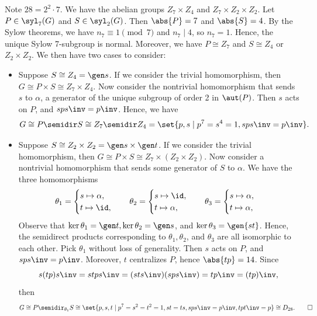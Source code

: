 \begin{sol}
    Note $28 = 2^2 \cdot 7$.
	We have the abelian groups $Z_7 \times Z_4$ and $Z_7 \times Z_2 \times Z_2$.
	Let $P \in \syl_7(G)$ and $S \in \syl_2(G)$.
	Then $\abs{P} = 7$ and $\abs{S} = 4$.
	By the Sylow theorems, we have $n_7 \equiv 1 \pmod 7$ and $n_7 \mid 4$, so $n_7 = 1$.
	Hence, the unique Sylow 7-subgroup is normal.
	Moreover, we have $P \cong Z_7$ and $S \cong Z_4$ or $Z_2 \times Z_2$.
	We then have two cases to consider:
    \begin{itemize}
        \item Suppose $S \cong Z_4 = \gen s$.
        If we consider the trivial homomorphism, then $G \cong P \times S \cong Z_7 \times Z_4$.
        Now consider the nontrivial homomorphism that sends $s$ to $\alpha$, a generator of the unique subgroup of order 2 in $\aut(P)$.
        Then $s$ acts on $P$, and $sps\inv = p\inv$.
        Hence, we have
        \[
        	G \cong P \semidir S \cong Z_7 \semidir Z_4 = \set{p, s \mid p^7 = s^4 = 1, sps\inv = p\inv}.
        \]
        \item Suppose $S \cong Z_2 \times Z_2 = \gen s \times \gen t$.
        If we consider the trivial homomorphism, then $G \cong P \times S \cong Z_7 \times (Z_2 \times Z_2)$.
        Now consider a nontrivial homomorphism that sends some generator of $S$ to $\alpha$.
        We have the three homomorphisms
        \[
        	\theta_1 = 
            \begin{cases}
                s \mapsto \alpha, \\
                t \mapsto \id,
            \end{cases} \quad
            \theta_2 = 
            \begin{cases}
                s \mapsto \id, \\
                t \mapsto \alpha,
            \end{cases} \quad
            \theta_3 = 
            \begin{cases}
                s \mapsto \alpha, \\
                t \mapsto \alpha,
            \end{cases}
        \]
        Observe that $\ker\theta_1 = \gen t, \ker\theta_2 = \gen s$, and $\ker\theta_3 = \gen{st}$.
        Hence, the semidirect products corresponding to $\theta_1, \theta_2$, and $\theta_3$ are all isomorphic to each other.
        Pick $\theta_1$ without loss of generality.
        Then $s$ acts on $P$, and $sps\inv = p\inv$.
        Moreover, $t$ centralizes $P$, hence $\abs{tp} = 14$.
        Since
        \[
        	s(tp)s\inv = stps\inv = (sts\inv)(sps\inv) = tp\inv = (tp)\inv,
        \]
        then
        \[
        	G \cong P \semidir_{\theta_1} S \cong \set{p, s, t \mid p^7 = s^2 = t^2 = 1, st = ts, sps\inv = p\inv, tpt\inv = p} \cong D_{28}. \qedhere
        \] 
    \end{itemize}
\end{sol}

